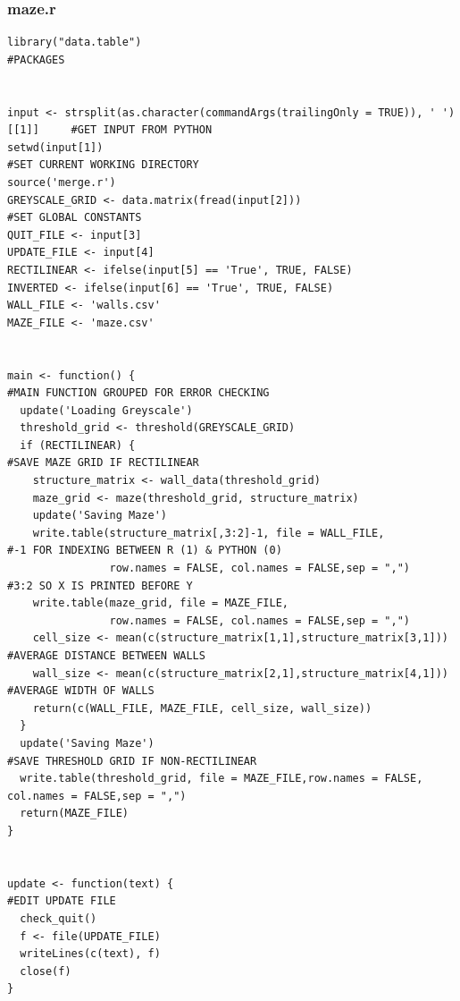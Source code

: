 \documentclass[titlepage]{article}
\begin{document}
\subsubsection{maze.r}
\begin{changemargin}{-1in}{-1in} 
\begin{verbatim}
library("data.table")                                                           #PACKAGES


input <- strsplit(as.character(commandArgs(trailingOnly = TRUE)), ' ')[[1]]     #GET INPUT FROM PYTHON
setwd(input[1])                                                                 #SET CURRENT WORKING DIRECTORY
source('merge.r')
GREYSCALE_GRID <- data.matrix(fread(input[2]))                                  #SET GLOBAL CONSTANTS
QUIT_FILE <- input[3]
UPDATE_FILE <- input[4]
RECTILINEAR <- ifelse(input[5] == 'True', TRUE, FALSE)
INVERTED <- ifelse(input[6] == 'True', TRUE, FALSE)
WALL_FILE <- 'walls.csv'
MAZE_FILE <- 'maze.csv'


main <- function() {                                                            #MAIN FUNCTION GROUPED FOR ERROR CHECKING
  update('Loading Greyscale')
  threshold_grid <- threshold(GREYSCALE_GRID)
  if (RECTILINEAR) {                                                            #SAVE MAZE GRID IF RECTILINEAR
    structure_matrix <- wall_data(threshold_grid)
    maze_grid <- maze(threshold_grid, structure_matrix)
    update('Saving Maze')
    write.table(structure_matrix[,3:2]-1, file = WALL_FILE,                     #-1 FOR INDEXING BETWEEN R (1) & PYTHON (0)
                row.names = FALSE, col.names = FALSE,sep = ",")                 #3:2 SO X IS PRINTED BEFORE Y
    write.table(maze_grid, file = MAZE_FILE,
                row.names = FALSE, col.names = FALSE,sep = ",")
    cell_size <- mean(c(structure_matrix[1,1],structure_matrix[3,1]))           #AVERAGE DISTANCE BETWEEN WALLS
    wall_size <- mean(c(structure_matrix[2,1],structure_matrix[4,1]))           #AVERAGE WIDTH OF WALLS
    return(c(WALL_FILE, MAZE_FILE, cell_size, wall_size))
  }
  update('Saving Maze')                                                         #SAVE THRESHOLD GRID IF NON-RECTILINEAR
  write.table(threshold_grid, file = MAZE_FILE,row.names = FALSE, col.names = FALSE,sep = ",")
  return(MAZE_FILE)
}


update <- function(text) {                                                      #EDIT UPDATE FILE
  check_quit()
  f <- file(UPDATE_FILE)
  writeLines(c(text), f)
  close(f)
}



\end{verbatim}
\end{changemargin}
\end{document}
